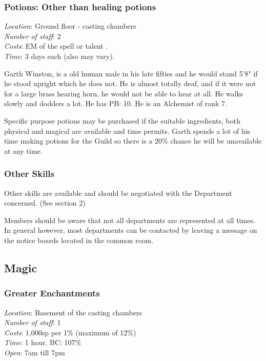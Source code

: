 \documentclass[twoside,a4paper]{article}
\begin{document}
\begin{multicols}{2}
\subsubsection{Potions: Other than healing potions}

\begin{flushleft}
\emph{Location}: Ground floor - casting chambers \\
\emph{Number of staff}: 2 \\
\emph{Costs}: EM of the spell or talent . \\
\emph{Time}: 3 days each (also may vary). \\
\end{flushleft}

Garth Winston, is a old human male in his late fifties and he would
stand 5'8" if he stood upright which he does not. He is almost totally
deaf, and if it were not for a large brass hearing horn, he would not
be able to hear at all. He walks slowly and dodders a lot.  He has PB:
10. He is an Alchemist of rank 7.

Specific purpose potions may be purchased if the suitable ingredients,
both physical and magical are available and time permits. Garth spends
a lot of his time making potions for the Guild so there is a 20\%
chance he will be unavailable at any time.

\subsubsection{Other Skills}

Other skills are available and should be negotiated with the
Department concerned.  (See section 2)

Members should be aware that not all departments are represented at
all times. In general however, most departments can be contacted by
leaving a message on the notice boards located in the common room.

\subsection{Magic}

\subsubsection{Greater Enchantments}

\begin{flushleft}
\emph{Location}: Basement of the casting chambers \\
\emph{Number of staff}: 1 \\
\emph{Costs}: 1,000sp per 1\% (maximum of 12\%) \\
\emph{Time}: 1 hour. BC: 107\% \\
\emph{Open}: 7am till 7pm \\
\end{flushleft}


\end{multicols}
\end{document}
